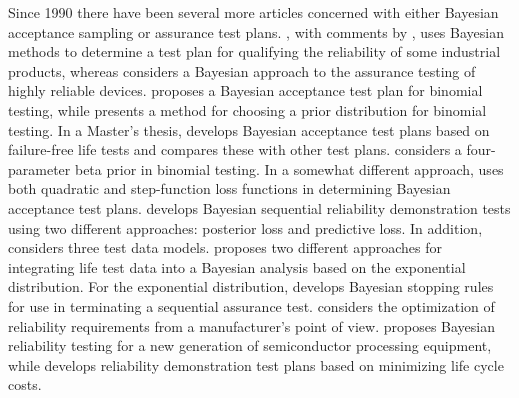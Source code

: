 \documentclass {book}
\begin{document}
Since 1990 there have been several more articles concerned with
either Bayesian acceptance sampling or assurance test plans.
\citet{H90},  with comments by \citet{GHMF90}, uses Bayesian
methods to determine a test plan for qualifying the reliability of
some industrial products, whereas \citet{GU90} considers a
Bayesian approach to the assurance testing of highly reliable
devices. \citet{F91} proposes a Bayesian acceptance test plan for
binomial testing, while \citet{SF92} presents a method for
choosing a prior distribution for binomial testing.  In a Master's
thesis, \citet{J91}  develops Bayesian acceptance test plans based
on failure-free life tests and compares these with other test
plans. \citet{PT92}  considers a four-parameter beta prior in
binomial testing. In a somewhat different approach, \citet{MT92}
  uses both quadratic and step-function
loss functions in determining Bayesian acceptance test plans.
\citet{BS93} develops Bayesian sequential reliability
demonstration tests using two different approaches: posterior loss
and predictive loss.  In addition, \citet{BS93}  considers three
test data models. \citet{WYK94}  proposes two different approaches
for integrating life test data into a Bayesian analysis based on
the exponential distribution. For the exponential distribution,
\citet{DK94}  develops Bayesian stopping rules for use in
terminating a sequential assurance test. \citet{V99} considers the
optimization of reliability requirements from a manufacturer's
point of view. \citet{TP03}  proposes Bayesian reliability testing
for a new generation of semiconductor processing equipment, while
\citet{KSB04}  develops reliability demonstration test plans based
on minimizing life cycle costs. 
      
   
   
\end{document}
